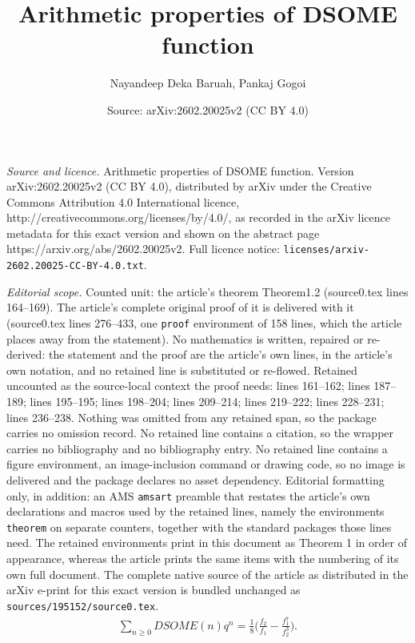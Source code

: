 \documentclass[10pt,a4paper]{amsart}
\title{Arithmetic properties of DSOME function}
\author{Nayandeep Deka Baruah, Pankaj Gogoi}
\date{Source: arXiv:2602.20025v2 (CC BY 4.0)}
\begin{document}
\maketitle

\noindent\emph{Source and licence.} Arithmetic properties of DSOME function. Version arXiv:2602.20025v2 (CC BY 4.0), distributed by arXiv under the Creative Commons Attribution 4.0 International licence, http://creativecommons.org/licenses/by/4.0/, as recorded in the arXiv licence metadata for this exact version and shown on the abstract page https://arxiv.org/abs/2602.20025v2. Full licence notice: \texttt{licenses/arxiv-2602.20025-CC-BY-4.0.txt}.\par\smallskip

\noindent\textit{Editorial scope.} Counted unit: the article's theorem Theorem1.2 (source0.tex lines 164--169). The article's complete original proof of it is delivered with it (source0.tex lines 276--433, one \texttt{proof} environment of 158 lines, which the article places away from the statement). No mathematics is written, repaired or re-derived: the statement and the proof are the article's own lines, in the article's own notation, and no retained line is substituted or re-flowed.  Retained uncounted as the source-local context the proof needs: lines 161--162; lines 187--189; lines 195--195; lines 198--204; lines 209--214; lines 219--222; lines 228--231; lines 236--238.  Nothing was omitted from any retained span, so the package carries no omission record.  No retained line contains a citation, so the wrapper carries no bibliography and no bibliography entry.  No retained line contains a figure environment, an image-inclusion command or drawing code, so no image is delivered and the package declares no asset dependency.  Editorial formatting only, in addition: an AMS \texttt{amsart} preamble that restates the article's own declarations and macros used by the retained lines, namely the environments \texttt{theorem} on separate counters, together with the standard packages those lines need.  The retained environments print in this document as Theorem 1 in order of appearance, whereas the article prints the same items with the numbering of its own full document.  The complete native source of the article as distributed in the arXiv e-print for this exact version is bundled unchanged as \texttt{sources/195152/source0.tex}.
 \begin{align}   \sum_{n\geq0}DSOME(n)q^n=\frac{1}{8}\bigg(\frac{f_2}{f_1}-\frac{f_1^7}{f_2^3}\bigg)\label{DSOMEgf}.
 \end{align} 
\end{document}

